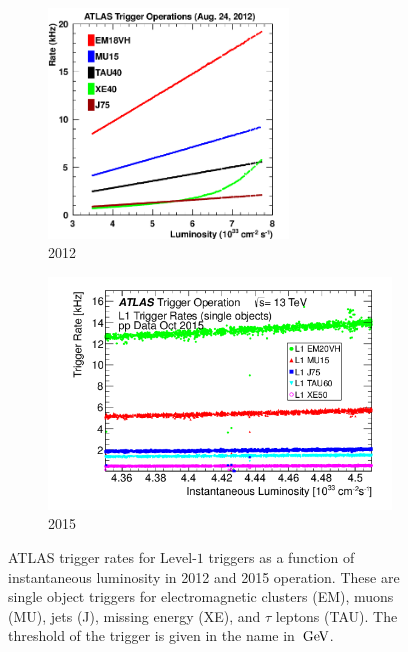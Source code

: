 \begin{figure}[h!]
  \centering
  \captionsetup{justification=centering}

   \begin{subfigure}[t]{0.5\textwidth}
        \centering
        \includegraphics[width=0.7\textwidth]{figures/2012_trigger_rates}
        \caption{2012}
    \end{subfigure}%
    \begin{subfigure}[t]{0.5\textwidth}
        \centering
        \includegraphics[width=\textwidth]{figures/2015_trigger_rate}
        \caption{2015}
    \end{subfigure}

   \caption{ATLAS trigger rates for Level-$1$ triggers as a function of instantaneous luminosity in 2012 and 2015 operation. These are single object triggers for electromagnetic clusters (EM), muons (MU), jets (J), missing energy (XE), and $\tau$ leptons (TAU). The threshold of the trigger is given in the name in $\GeV$.~\cite{TriggerOps}}
  \label{fig:trigger_rates}
\end{figure}

